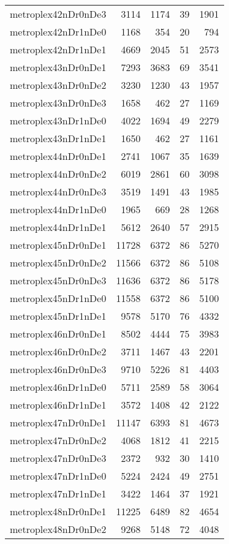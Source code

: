 \documentclass[../../../thesis.tex]{subfiles}
\begin{document}
\begin{longtable}{lrrrr}
metroplex42nDr0nDe3 & 3114 & 1174 & 39 & 1901 \\
metroplex42nDr1nDe0 & 1168 & 354 & 20 & 794 \\
metroplex42nDr1nDe1 & 4669 & 2045 & 51 & 2573 \\
metroplex43nDr0nDe1 & 7293 & 3683 & 69 & 3541 \\
metroplex43nDr0nDe2 & 3230 & 1230 & 43 & 1957 \\
metroplex43nDr0nDe3 & 1658 & 462 & 27 & 1169 \\
metroplex43nDr1nDe0 & 4022 & 1694 & 49 & 2279 \\
metroplex43nDr1nDe1 & 1650 & 462 & 27 & 1161 \\
metroplex44nDr0nDe1 & 2741 & 1067 & 35 & 1639 \\
metroplex44nDr0nDe2 & 6019 & 2861 & 60 & 3098 \\
metroplex44nDr0nDe3 & 3519 & 1491 & 43 & 1985 \\
metroplex44nDr1nDe0 & 1965 & 669 & 28 & 1268 \\
metroplex44nDr1nDe1 & 5612 & 2640 & 57 & 2915 \\
metroplex45nDr0nDe1 & 11728 & 6372 & 86 & 5270 \\
metroplex45nDr0nDe2 & 11566 & 6372 & 86 & 5108 \\
metroplex45nDr0nDe3 & 11636 & 6372 & 86 & 5178 \\
metroplex45nDr1nDe0 & 11558 & 6372 & 86 & 5100 \\
metroplex45nDr1nDe1 & 9578 & 5170 & 76 & 4332 \\
metroplex46nDr0nDe1 & 8502 & 4444 & 75 & 3983 \\
metroplex46nDr0nDe2 & 3711 & 1467 & 43 & 2201 \\
metroplex46nDr0nDe3 & 9710 & 5226 & 81 & 4403 \\
metroplex46nDr1nDe0 & 5711 & 2589 & 58 & 3064 \\
metroplex46nDr1nDe1 & 3572 & 1408 & 42 & 2122 \\
metroplex47nDr0nDe1 & 11147 & 6393 & 81 & 4673 \\
metroplex47nDr0nDe2 & 4068 & 1812 & 41 & 2215 \\
metroplex47nDr0nDe3 & 2372 & 932 & 30 & 1410 \\
metroplex47nDr1nDe0 & 5224 & 2424 & 49 & 2751 \\
metroplex47nDr1nDe1 & 3422 & 1464 & 37 & 1921 \\
metroplex48nDr0nDe1 & 11225 & 6489 & 82 & 4654 \\
metroplex48nDr0nDe2 & 9268 & 5148 & 72 & 4048 \\

\end{longtable}
\end{document}
